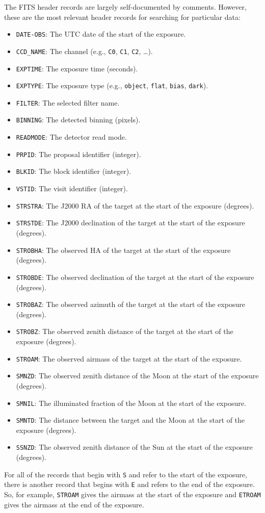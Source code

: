 The FITS header records are largely self-documented by comments. However, these are the most relevant header records for searching for particular data:

\begin{itemize}
\item \verb|DATE-OBS|: The UTC date of the start of the exposure.
\item \verb|CCD_NAME|: The channel (e.g., \verb|C0|, \verb|C1|, \verb|C2|, \ldots).
\item \verb|EXPTIME|: The exposure time (seconds).
\item \verb|EXPTYPE|: The exposure type (e.g., \verb|object|, \verb|flat|, \verb|bias|, \verb|dark|).
\item \verb|FILTER|: The selected filter name.
\item \verb|BINNING|: The detected binning (pixels).
\item \verb|READMODE|: The detector read mode.
\item \verb|PRPID|: The proposal identifier (integer).
\item \verb|BLKID|: The block identifier (integer).
\item \verb|VSTID|: The visit identifier (integer).
\item \verb|STRSTRA|: The J2000 RA of the target at the start of the exposure (degrees).
\item \verb|STRSTDE|: The J2000 declination of the target at the start of the exposure (degrees).
\item \verb|STROBHA|: The observed HA of the target at the start of the exposure (degrees).
\item \verb|STROBDE|: The observed declination of the target at the start of the exposure (degrees).
\item \verb|STROBAZ|: The observed azimuth of the target at the start of the exposure (degrees).
\item \verb|STROBZ|: The observed zenith distance of the target at the start of the exposure (degrees).
\item \verb|STROAM|: The observed airmass of the target at the start of the exposure.
\item \verb|SMNZD|: The observed zenith distance of the Moon at the start of the exposure (degrees).
\item \verb|SMNIL|: The illuminated fraction of the Moon at the start of the exposure.
\item \verb|SMNTD|: The distance between the target and the Moon at the start of the exposure (degrees).
\item \verb|SSNZD|: The observed zenith distance of the Sun at the start of the exposure (degrees).
\end{itemize}
For all of the records that begin with \verb|S| and refer to the start of the exposure, there is another record that begins with \verb|E| and refers to the end of the exposure. So, for example, \verb|STROAM| gives the airmass at the start of the exposure and \verb|ETROAM| gives the airmass at the end of the exposure.

